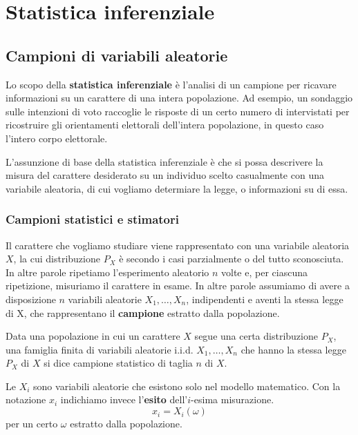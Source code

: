 \part{Statistica inferenziale}

\chapter{Campioni di variabili aleatorie}
Lo scopo della \textbf{statistica inferenziale} è l'analisi di un campione per ricavare
informazioni su un carattere di una intera popolazione. Ad esempio, un sondaggio sulle intenzioni
di voto raccoglie le risposte di un certo numero di intervistati per ricostruire gli orientamenti
elettorali dell’intera popolazione, in questo caso l’intero corpo elettorale.

L’assunzione di base della statistica inferenziale è che si possa descrivere la misura del carattere
desiderato su un individuo scelto casualmente con una variabile aleatoria, di cui vogliamo
determiare la legge, o informazioni su di essa.

\section{Campioni statistici e stimatori}
Il carattere che vogliamo studiare viene rappresentato con una variabile aleatoria
$X$, la cui distribuzione $P_X$ è secondo i casi parzialmente o del tutto sconosciuta. In altre
parole ripetiamo l'esperimento aleatorio $n$ volte e, per ciascuna ripetizione, misuriamo il
carattere in esame. In altre parole assumiamo di avere a disposizione $n$ variabili aleatorie
$X_1, \dots, X_n$, indipendenti e aventi la stessa legge di X, che rappresentano il
\textbf{campione} estratto dalla popolazione.

\begin{definition}\label{def: campione statistico}
	Data una popolazione in cui un carattere $X$ segue una certa distribuzione $P_X$, una famiglia
	finita di variabili aleatorie i.i.d. $X_1, \dots, X_n$ che hanno la stessa legge $P_X$ di $X$
	si dice campione statistico di taglia $n$ di $X$.
\end{definition}

\begin{observation}
	Le $X_i$ sono variabili aleatorie che esistono solo nel modello matematico. Con la notazione
	$x_i$ indichiamo invece l'\textbf{esito} dell'$i$-esima misurazione.
	\[ x_i = X_i(\omega) \]
	per un certo $\omega$ estratto dalla popolazione.
\end{observation}

